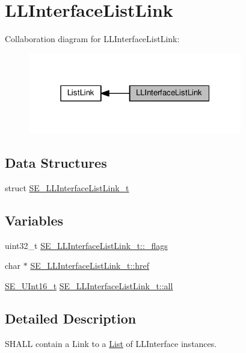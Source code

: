 \hypertarget{group__LLInterfaceListLink}{}\section{L\+L\+Interface\+List\+Link}
\label{group__LLInterfaceListLink}
Collaboration diagram for L\+L\+Interface\+List\+Link\+:\nopagebreak
\begin{figure}[H]
\begin{center}
\leavevmode
\includegraphics[width=265pt]{group__LLInterfaceListLink}
\end{center}
\end{figure}
\subsection*{Data Structures}
\begin{DoxyCompactItemize}
\item 
struct \hyperlink{structSE__LLInterfaceListLink__t}{S\+E\+\_\+\+L\+L\+Interface\+List\+Link\+\_\+t}
\end{DoxyCompactItemize}
\subsection*{Variables}
\begin{DoxyCompactItemize}
\item 
uint32\+\_\+t \hyperlink{group__LLInterfaceListLink_ga6fe2edb567956b79e403f7d527f393c9}{S\+E\+\_\+\+L\+L\+Interface\+List\+Link\+\_\+t\+::\+\_\+flags}
\item 
char $\ast$ \hyperlink{group__LLInterfaceListLink_gae5704d601086f05c2eec2e9fa79575e1}{S\+E\+\_\+\+L\+L\+Interface\+List\+Link\+\_\+t\+::href}
\item 
\hyperlink{group__UInt16_gac68d541f189538bfd30cfaa712d20d29}{S\+E\+\_\+\+U\+Int16\+\_\+t} \hyperlink{group__LLInterfaceListLink_ga56592daceaa11b288eabb30bc1c2a6f8}{S\+E\+\_\+\+L\+L\+Interface\+List\+Link\+\_\+t\+::all}
\end{DoxyCompactItemize}


\subsection{Detailed Description}
S\+H\+A\+LL contain a Link to a \hyperlink{structList}{List} of L\+L\+Interface instances. 

